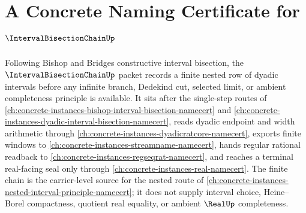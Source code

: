 \chapter{A Concrete Naming Certificate for $\IntervalBisectionChainUp$}
\label{ch:concrete-instances-interval-bisection-chain-namecert}

Following Bishop and Bridges constructive interval bisection, the $\IntervalBisectionChainUp$ packet records a finite nested row of dyadic intervals before any infinite branch, Dedekind cut, selected limit, or ambient completeness principle is available. It sits after the single-step routes of \autoref{ch:concrete-instances-bishop-interval-bisection-namecert} and \autoref{ch:concrete-instances-dyadic-interval-bisection-namecert}, reads dyadic endpoint and width arithmetic through \autoref{ch:concrete-instances-dyadicratcore-namecert}, exports finite windows to \autoref{ch:concrete-instances-streamname-namecert}, hands regular rational readback to \autoref{ch:concrete-instances-regseqrat-namecert}, and reaches a terminal real-facing seal only through \autoref{ch:concrete-instances-real-namecert}. The finite chain is the carrier-level source for the nested route of \autoref{ch:concrete-instances-nested-interval-principle-namecert}; it does not supply interval choice, Heine--Borel compactness, quotient real equality, or ambient $\RealUp$ completeness.



